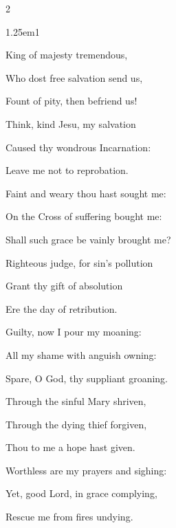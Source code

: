 \begin{multicols}{2}
\begin{hangparas}{1.25em}{1}
\par\noindent
King of majesty tremendous,\par\noindent
Who dost free salvation send us,\par\noindent
Fount of pity, then befriend us!\par
\vspace{0.5\baselineskip}
\par\noindent
Think, kind Jesu, my salvation\par\noindent
Caused thy wondrous Incarnation:\par\noindent
Leave me not to reprobation.\par
\vspace{0.5\baselineskip}
\par\noindent
Faint and weary thou hast sought me:\par\noindent
On the Cross of suffering bought me:\par\noindent
Shall such grace be vainly brought me?\par
\vspace{0.5\baselineskip}
\par\noindent
Righteous judge, for sin's pollution\par\noindent
Grant thy gift of absolution\par\noindent
Ere the day of retribution.\par
\vspace{0.5\baselineskip}
\par\noindent
Guilty, now I pour my moaning:\par\noindent
All my shame with anguish owning:\par\noindent
Spare, O God, thy suppliant groaning.\par
\vspace{0.5\baselineskip}
\par\noindent
Through the sinful Mary shriven,\par\noindent
Through the dying thief forgiven,\par\noindent
Thou to me a hope hast given.\par
\vspace{0.5\baselineskip}
\par\noindent
Worthless are my prayers and sighing:\par\noindent
Yet, good Lord, in grace complying,\par\noindent
Rescue me from fires undying.\par
\vspace{0.5\baselineskip}
\par\noindent

\end{hangparas}
\end{multicols}
